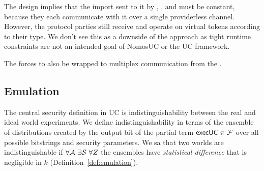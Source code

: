 The \partywrapper design implies that the import sent to it by \F, \Z, and \A must be constant, because they each communicate with it over a single providerless channel. However, the protocol parties still receive and operate on virtual tokens according to their type. 
We don't see this as a downside of the approach as tight runtime constraints are not an intended goal of NomosUC or the UC framework.

The \partywrapper forces \F to also be wrapped to multiplex communication from the \partywrapper. 

\subsection{Emulation}
The central security definition in UC is indistinguishability between the real and ideal world experiments.
We define indistinguishability in terms of the ensemble of distributions created by the output bit of the partial term $\mathsf{execUC}\ \pi\ \mathcal{F}$ over all possible bitstrings and security parameters. 
We sa that two worlds are indistinguishable if $\forall \mathcal{A}\ \exists \mathcal{S}\ \forall Z$ the ensembles have  \emph{statistical difference} that is negligible in $k$ (Definition~\ref{def:emulation}).


